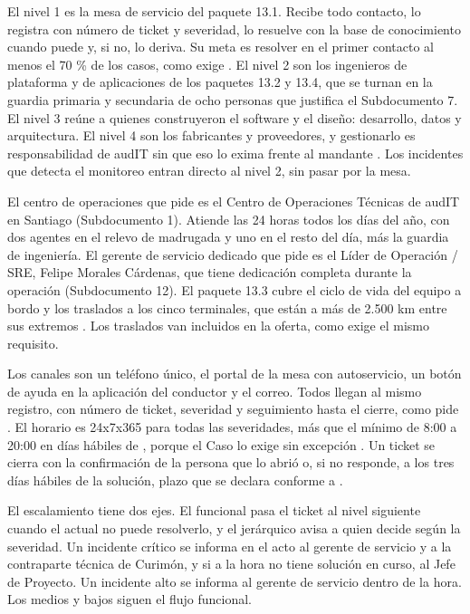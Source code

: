 El nivel 1 es la mesa de servicio del paquete 13.1. Recibe todo contacto, lo registra con número de
ticket y severidad, lo resuelve con la base de conocimiento cuando puede y, si no, lo deriva. Su meta es
resolver en el primer contacto al menos el 70 \% de los casos, como exige . El
nivel 2 son los ingenieros de plataforma y de aplicaciones de los paquetes 13.2 y 13.4, que se turnan
en la guardia primaria y secundaria de ocho personas que justifica el Subdocumento 7. El nivel 3 reúne
a quienes construyeron el software y el diseño: desarrollo, datos y arquitectura. El nivel 4 son los
fabricantes y proveedores, y gestionarlo es responsabilidad de audIT sin que eso lo exima frente al
mandante . Los incidentes que detecta el monitoreo entran directo al nivel 2,
sin pasar por la mesa.

El centro de operaciones que pide  es el Centro de Operaciones Técnicas de audIT en
Santiago (Subdocumento 1). Atiende las 24 horas todos los días del año, con dos agentes en el relevo de
madrugada y uno en el resto del día, más la guardia de ingeniería. El gerente de servicio dedicado que
pide  es el Líder de Operación / SRE, Felipe Morales Cárdenas, que tiene dedicación
completa durante la operación (Subdocumento 12). El paquete 13.3 cubre el ciclo de vida del equipo a
bordo y los traslados a los cinco terminales, que están a más de 2.500 km entre sus extremos
. Los traslados van incluidos en la oferta, como exige el mismo requisito.

Los canales son un teléfono único, el portal de la mesa con autoservicio, un botón de ayuda en la
aplicación del conductor y el correo. Todos llegan al mismo registro, con número de ticket, severidad y
seguimiento hasta el cierre, como pide . El horario es 24x7x365 para todas las
severidades, más que el mínimo de 8:00 a 20:00 en días hábiles de , porque el Caso
lo exige sin excepción . Un ticket se cierra con la confirmación de la persona que lo
abrió o, si no responde, a los tres días hábiles de la solución, plazo que se declara conforme a
.

El escalamiento tiene dos ejes. El funcional pasa el ticket al nivel siguiente cuando el actual no puede
resolverlo, y el jerárquico avisa a quien decide según la severidad. Un incidente crítico se informa en
el acto al gerente de servicio y a la contraparte técnica de Curimón, y si a la hora no tiene solución
en curso, al Jefe de Proyecto. Un incidente alto se informa al gerente de servicio dentro de la hora.
Los medios y bajos siguen el flujo funcional.

